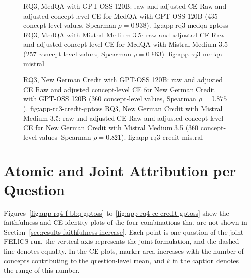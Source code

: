 \begin{figure}[H]
  \centering
    {RQ3, MedQA with GPT-OSS 120B: raw and adjusted CE}%
    {Raw and adjusted concept-level CE for MedQA with GPT-OSS 120B (435 concept-level values, Spearman $\rho=0.938$).}%
    {fig:app-rq3-medqa-gptoss}%
  \hfill
    {RQ3, MedQA with Mistral Medium 3.5: raw and adjusted CE}%
    {Raw and adjusted concept-level CE for MedQA with Mistral Medium 3.5 (257 concept-level values, Spearman $\rho=0.963$).}%
    {fig:app-rq3-medqa-mistral}%
\end{figure}

\begin{figure}[H]
  \centering
    {RQ3, New German Credit with GPT-OSS 120B: raw and adjusted CE}%
    {Raw and adjusted concept-level CE for New German Credit with GPT-OSS 120B (360 concept-level values, Spearman $\rho=0.875$).}%
    {fig:app-rq3-credit-gptoss}%
  \hfill
    {RQ3, New German Credit with Mistral Medium 3.5: raw and adjusted CE}%
    {Raw and adjusted concept-level CE for New German Credit with Mistral Medium 3.5 (360 concept-level values, Spearman $\rho=0.821$).}%
    {fig:app-rq3-credit-mistral}%
\end{figure}

\section{Atomic and Joint Attribution per Question}
\label{app:rq4-identity}

Figures~\ref{fig:app-rq4-f-bbq-gptoss} to~\ref{fig:app-rq4-ce-credit-gptoss} show the faithfulness and CE identity plots of the four combinations that are not shown in Section~\ref{sec:results-faithfulness-increase}. Each point is one question of the joint FELICS run, the vertical axis represents the joint formulation, and the dashed line denotes equality. In the CE plots, marker area increases with the number of concepts contributing to the question-level mean, and $k$ in the caption denotes the range of this number.


